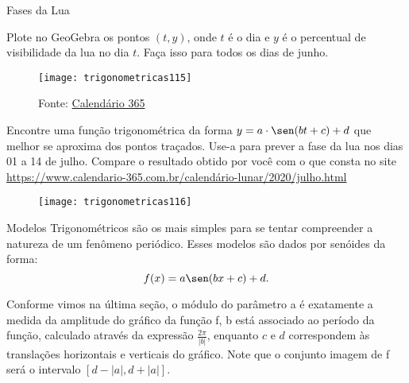 \clearpage
\begin{task}{Fases da Lua}

Plote no GeoGebra os pontos $(t,y)$, onde $t$ é o dia e $y$ é o percentual de visibilidade da lua no dia $t$. Faça isso para todos os dias de junho.

\begin{figure}[H]
\centering

\texttt{[image: trigonometricas115]}
\caption{Fonte: \href{https://www.calendario-365.com.br/calend\%C3\%A1rio-lunar/2020/junho.html}{Calendário 365}}

\end{figure}

Encontre uma função trigonométrica da forma $y = a\cdot\sen(bt+c) +d$ que melhor se aproxima dos pontos traçados. Use-a para prever a fase da lua nos dias 01 a 14 de julho. Compare o resultado obtido por você com o que consta no site \url{https://www.calendario-365.com.br/calendário-lunar/2020/julho.html}

\begin{figure}[H]
\centering

\texttt{[image: trigonometricas116]}
\end{figure}
\end{task}


Modelos Trigonométricos são os mais simples para se tentar compreender a natureza de um fenômeno periódico. Esses modelos são dados por senóides da forma:
\begin{equation*}
f(x)= a\sen(bx+c) + d.
\end{equation*}

Conforme vimos na última seção, o módulo do parâmetro a é exatamente a medida da amplitude do gráfico da função f, b está associado ao período da função, calculado através da expressão $\frac{2\pi}{|b|}$, enquanto $c$ e $d$ correspondem às translações horizontais e verticais do gráfico. Note que o conjunto imagem de f será o intervalo $[d -|a|, d+|a|]$.

